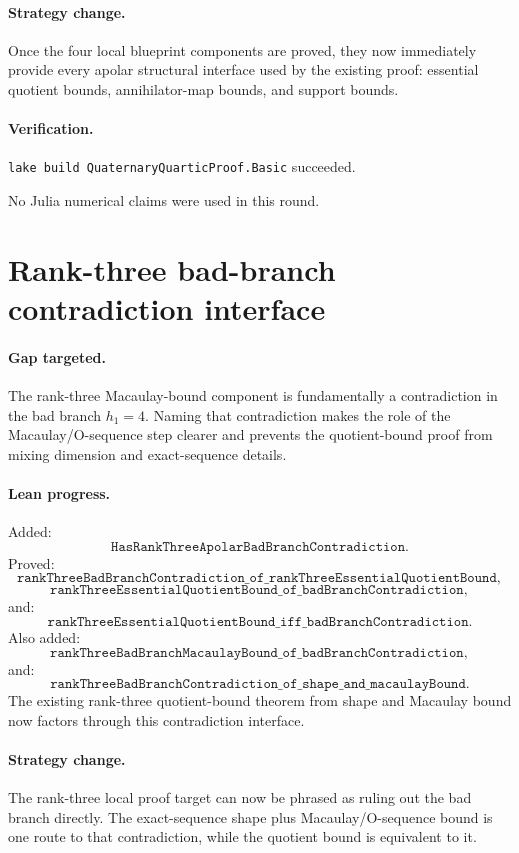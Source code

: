 \documentclass[11pt]{article}
\begin{document}
\paragraph{Strategy change.}
Once the four local blueprint components are proved, they now immediately
provide every apolar structural interface used by the existing proof:
essential quotient bounds, annihilator-map bounds, and support bounds.

\paragraph{Verification.}
\texttt{lake build QuaternaryQuarticProof.Basic} succeeded.

No Julia numerical claims were used in this round.

\section*{Rank-three bad-branch contradiction interface}

\paragraph{Gap targeted.}
The rank-three Macaulay-bound component is fundamentally a contradiction in
the bad branch \(h_1=4\).  Naming that contradiction makes the role of the
Macaulay/O-sequence step clearer and prevents the quotient-bound proof from
mixing dimension and exact-sequence details.

\paragraph{Lean progress.}
Added:
\[
\texttt{HasRankThreeApolarBadBranchContradiction}.
\]
Proved:
\[
\texttt{rankThreeBadBranchContradiction\_of\_rankThreeEssentialQuotientBound},
\]
\[
\texttt{rankThreeEssentialQuotientBound\_of\_badBranchContradiction},
\]
and:
\[
\texttt{rankThreeEssentialQuotientBound\_iff\_badBranchContradiction}.
\]
Also added:
\[
\texttt{rankThreeBadBranchMacaulayBound\_of\_badBranchContradiction},
\]
and:
\[
\texttt{rankThreeBadBranchContradiction\_of\_shape\_and\_macaulayBound}.
\]
The existing rank-three quotient-bound theorem from shape and Macaulay bound
now factors through this contradiction interface.

\paragraph{Strategy change.}
The rank-three local proof target can now be phrased as ruling out the bad
branch directly.  The exact-sequence shape plus Macaulay/O-sequence bound is
one route to that contradiction, while the quotient bound is equivalent to it.
\end{document}
